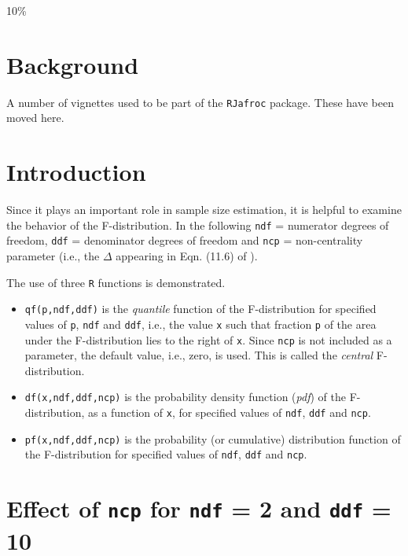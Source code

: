 \documentclass[
]{book}
\begin{document}
10\%

\hypertarget{background}{%
\section{Background}\label{background}}

A number of vignettes used to be part of the \texttt{RJafroc} package. These have been moved here.

\hypertarget{introduction-1}{%
\section{Introduction}\label{introduction-1}}

Since it plays an important role in sample size estimation, it is helpful to examine the behavior of the F-distribution. In the following \texttt{ndf} = numerator degrees of freedom, \texttt{ddf} = denominator degrees of freedom and \texttt{ncp} = non-centrality parameter (i.e., the \(\Delta\) appearing in Eqn. (11.6) of \citep{chakraborty2017observer}).

The use of three \texttt{R} functions is demonstrated.

\begin{itemize}
\item
  \texttt{qf(p,ndf,ddf)} is the \emph{quantile} function of the F-distribution for specified values of \texttt{p}, \texttt{ndf} and \texttt{ddf}, i.e., the value \texttt{x} such that fraction \texttt{p} of the area under the F-distribution lies to the right of \texttt{x}. Since \texttt{ncp} is not included as a parameter, the default value, i.e., zero, is used. This is called the \emph{central} F-distribution.
\item
  \texttt{df(x,ndf,ddf,ncp)} is the probability density function (\emph{pdf}) of the F-distribution, as a function of \texttt{x}, for specified values of \texttt{ndf}, \texttt{ddf} and \texttt{ncp}.
\item
  \texttt{pf(x,ndf,ddf,ncp)} is the probability (or cumulative) distribution function of the F-distribution for specified values of \texttt{ndf}, \texttt{ddf} and \texttt{ncp}.
\end{itemize}

\hypertarget{effect-of-ncp-for-ndf-2-and-ddf-10}{%
\section{\texorpdfstring{Effect of \texttt{ncp} for \texttt{ndf} = 2 and \texttt{ddf} = 10}{Effect of ncp for ndf = 2 and ddf = 10}}\label{effect-of-ncp-for-ndf-2-and-ddf-10}}
\end{document}
